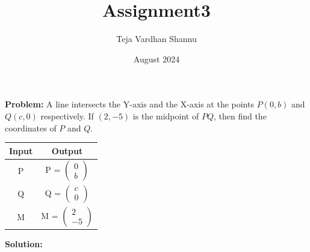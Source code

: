 \documentclass{article}
\title{Assignment3}
\author{Teja Vardhan Shannu}
\date{August 2024}
\begin{document}
\maketitle
\textbf{Problem:} A line intersects the Y-axis and the X-axis at the points $P(0,b)$ and $Q(c,0)$ respectively. If $(2,-5)$ is the midpoint of $PQ$, then find the coordinates of $P$ and $Q$.

\begin{table}[h]
\centering

\begin{tabular}{|c|c|}
\hline
Input & Output\\ \hline
P & {P} = $\begin{pmatrix} 0 \\ b \end{pmatrix}$\\ \hline
Q & {Q} = $\begin{pmatrix} c \\ 0 \end{pmatrix}$ \\ \hline
M & {M} = $\begin{pmatrix} 2 \\ -5 \end{pmatrix}$ \\ \hline

\end{tabular}
\end{table}

\textbf{Solution:}
\end{document}
